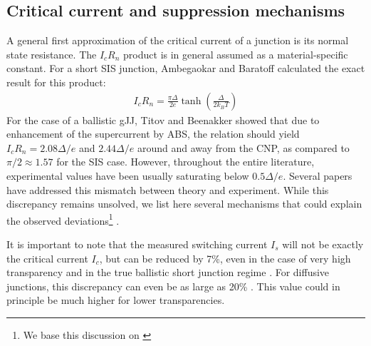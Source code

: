 \subsection{Critical current and suppression mechanisms}
A general first approximation of the critical current of a junction is its normal state resistance.
The $I_c R_n$ product is in general assumed as a material-specific constant\cite{tinkhamIntroductionSuperconductivity1996}.
For a short SIS junction, Ambegaokar and Baratoff calculated the exact result for this product:
\begin{eqnarray}
I_c R_n = \frac{\pi\Delta}{2e}\tanh\left(\frac{\Delta}{2k_BT}\right)
\end{eqnarray}
For the case of a ballistic gJJ, Titov and Beenakker\cite{titovJosephsonEffectBallistic2006b} showed that due to enhancement of the supercurrent by ABS, the relation should yield $I_cR_n=2.08\Delta/e$ and $2.44\Delta/e$ around and away from the CNP, as compared to $\pi/2\approx1.57$ for the SIS case.
However, throughout the entire literature, experimental values have been usually saturating below $0.5\Delta/e$.
Several papers have addressed this mismatch between theory and experiment.
While this discrepancy remains unsolved, we list here several mechanisms that could explain the observed deviations\footnote{We base this discussion on \cite{choiCompleteGateControl2013}} .

It is important to note that the measured switching current $I_s$ will not be exactly the critical current $I_c$, but can be reduced by 7\%, even in the case of very high transparency and in the true ballistic short junction regime \cite{leeUltimatelyShortBallistic2015}.
For diffusive junctions, this discrepancy can even be as large as 20\% \cite{keCriticalCurrentScaling2016}.
This value could in principle be much higher for lower transparencies.

